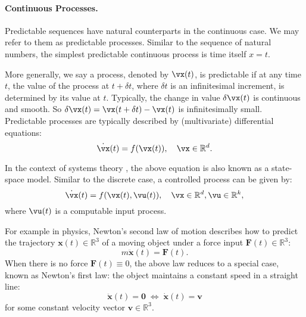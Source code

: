 \documentclass[../../book-main.tex]{subfiles}
\begin{document}
\paragraph{Continuous Processes.}
Predictable sequences have natural counterparts in the continuous case. We may refer to them as predictable processes. Similar to the sequence of natural numbers, the simplest predictable continuous process is time itself $x=t$.

More generally, we say a process, denoted by $\vx(t)$, is predictable if at any time $t$, the value of the process at $t+\delta t$, where $\delta t$ is an infinitesimal increment, is determined by its value at $t$. Typically, the change in value $\delta \vx(t)$ is continuous and smooth. So $\delta \vx(t) = \vx(t + \delta t) - \vx(t)$ is infinitesimally small.  Predictable processes are typically described by (multivariate) differential equations:
\begin{equation}
    \dot{\vx}(t) = f(\vx(t)), \quad \vx \in \mathbb{R}^d. 
    \label{eqn:process}
\end{equation}

In the context of systems theory \cite{Cal:Des,Sastry-Nonlinear}, the above equation is also known as a state-space model. Similar to the discrete case, a controlled process can be given by:
\begin{equation}
    \dot{\vx}(t) = f(\vx(t), \vu(t) ), \quad \vx \in \mathbb{R}^d, \vu \in \mathbb{R}^k,
    \label{eqn:process-controlled}
\end{equation}
where $\vu(t)$ is a computable input process. 

\begin{example}
    For example in physics, Newton's second law of motion describes how to predict the trajectory $\boldsymbol{x}(t) \in \mathbb{R}^3$ of a moving object under a force input $\boldsymbol{F}(t) \in \mathbb{R}^3$:
\begin{equation}
    m\ddot{\boldsymbol{x}}(t) = \boldsymbol{F}(t).
\end{equation}
When there is no force $\boldsymbol{F}(t) \equiv 0$, the above law reduces to a  special case, known as Newton's first law: the object maintains a constant speed in a straight line:
\begin{equation}
   \ddot{\boldsymbol{x}}(t) = \boldsymbol{0} \; \Leftrightarrow \; \dot{\boldsymbol{x}}(t) = \boldsymbol{v}
\end{equation}
for some constant velocity vector $\boldsymbol{v} \in \mathbb{R}^3$.
\end{example}
\end{document}
